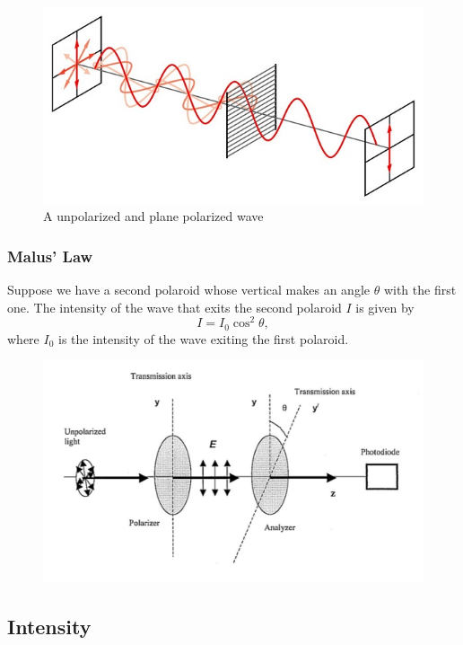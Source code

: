 \begin{figure}[h!]
    \centering
    \includegraphics[scale=0.75]{notes/images/Polarization-1.JPG}
    \caption{A unpolarized and plane polarized wave}
\end{figure}
\FloatBarrier

\subsubsection{Malus' Law}

Suppose we have a second polaroid whose vertical makes an angle $\theta$ with the first one. The intensity of the wave that exits the second polaroid $I$ is given by
\begin{equation}
    I = I_0 \cos^2 \theta,
\end{equation}
where $I_0$ is the intensity of the wave exiting the first polaroid. 

\begin{figure}[h!]
    \centering
    \includegraphics[scale=0.75]{notes/images/Malus-Law.JPG}
\end{figure}
\FloatBarrier

\subsection{Intensity}
\label{subsection:intensity}

